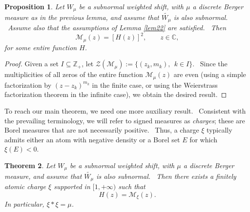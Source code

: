 \documentclass[12pt]{amsart}
\newtheorem{thm}{Theorem}[section]
\newtheorem{prop}[thm]{Proposition}
\newcommand{\C}{\mathbb{C}}
\begin{document}
\begin{prop} Let $W_\mu$ be a subnormal weighted shift, with $\mu$ a discrete Berger measure as in the previous lemma, and assume that $\widetilde{ W_\mu}$ is also subnormal. \ Assume also that the assumptions of Lemma \ref{lem22} are satisfied. \ Then 
$$
\mathcal{M}_{\mu}(z)=[H(z)]^2,
\qquad z\in\C,$$
for some entire function  $H$.
\end{prop}

\begin{proof}
    Given a set $I \subseteq \mathbb{Z}_+$, let $ \mathcal{Z}(\mathcal{M}_{\mu}):= \{(z_k,m_k), \: \: k \in I\}$. \  Since the multiplicities of all zeros of the entire function $\mathcal{M}_{\mu}(z)$ are even (using a simple factorization by $(z-z_k)^{m_k}$ in the finite case, or using the Weierstrass factorization theorem in the infinite case), we obtain the desired result.
    \end{proof}
    
To reach our main theorem, we need one more auxiliary result. \ Consistent with the prevailing terminology, we will refer to signed measures as {\it charges}; these are Borel measures that are not necessarily positive. \ Thus, a charge $\xi$ typically admits either an atom with negative density or a Borel set $E$ for which $\xi(E)<0$.

\begin{thm}\label{signedroot} Let $W_\mu$ be a subnormal weighted shift, with $\mu$ a discrete Berger measure, and assume that $\widetilde{ W_\mu}$ is also subnormal. \ Then there exists a finitely atomic charge $\xi$ supported in $[1,+\infty)$ such that 
$$
H(z)=\mathcal{M}_{\xi}(z).
$$
In particular, $\xi*\xi=\mu$.
\end{thm} 
\end{document}
